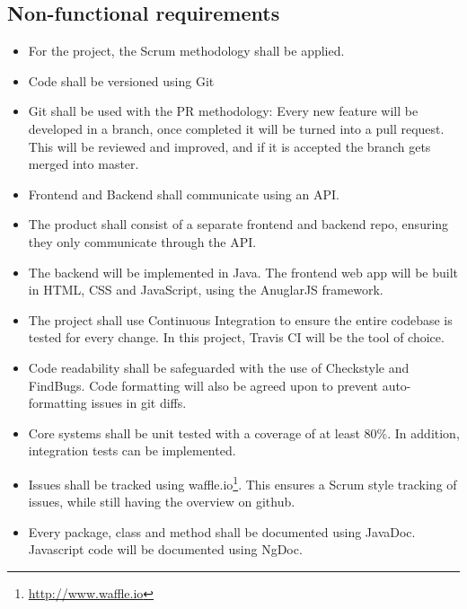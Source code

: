\subsection{Non-functional requirements}
\begin{itemize}

\item For the project, the Scrum methodology shall be applied.

\item Code shall be versioned using Git

\item Git shall be used with the PR methodology: Every new feature will be developed in a branch, once completed it will be turned into a pull request. This will be reviewed and improved, and if it is accepted the branch gets merged into master.

\item Frontend and Backend shall communicate using an API.

\item The product shall consist of a separate frontend and backend repo, ensuring they only communicate through the API.

\item The backend will be implemented in Java. The frontend web app will be built in \gls{HTML}, \gls{CSS} and \gls{JavaScript}, using the \gls{AnuglarJS} framework. 

\item The project shall use Continuous Integration to ensure the entire codebase is tested for every change. In this project, \gls{Travis CI} will be the tool of choice.

\item Code readability shall be safeguarded with the use of Checkstyle and FindBugs. Code formatting will also be agreed upon to prevent auto-formatting issues in git diffs.

\item Core systems shall be unit tested with a coverage of at least 80\%. In addition, integration tests can be implemented.

\item Issues shall be tracked using waffle.io\footnote{\url{http://www.waffle.io}}. This ensures a Scrum style tracking of issues, while still having the overview on github.

\item Every package, class and method shall be documented using JavaDoc. Javascript code will be documented using NgDoc. 

\end{itemize}
